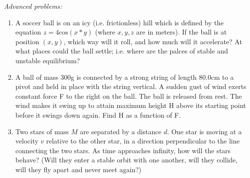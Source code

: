 \documentclass[12pt]{article}
\begin{document}
\emph{Advanced problems:}
\begin{enumerate}
\item
A soccer ball is on an icy (i.e. frictionless) hill which is defined by the equation $z=4\text{cos}(x*y)$ (where $x, y, z$ are in meters). If the ball is at position $(x, y)$, which way will it roll, and how much will it accelerate? At what places could the ball settle; i.e. where are the palces of stable and unstable equilibrium? 

\item
A ball of mass 300g is connected by a strong string of length 80.0cm to a pivot and held in place with the string vertical. A sudden gust of wind exerts constant force F to the right on the ball. The ball is released from rest. The wind makes it swing up to attain maximum height  H above its starting point before it swings down again. Find H as a function of F.

\item
Two stars of mass $M$ are separated by a distance $d$. One star is moving at a velocity $v$ relative to the other star, in a direction perpendicular to the line connecting the two stars. As time approaches infinity, how will the stars behave? (Will they enter a stable orbit with one another, will they collide, will they fly apart and never meet again?)
\end{enumerate}
\end{document}
